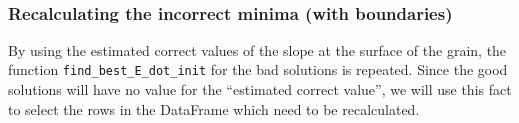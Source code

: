 \documentclass[11pt]{article}
\begin{document}
    \begin{center}
    \end{center}
    { \hspace*{\fill} \\}
    
    \hypertarget{recalculating-the-incorrect-minima-with-boundaries}{%
\subsubsection{Recalculating the incorrect minima (with
boundaries)}\label{recalculating-the-incorrect-minima-with-boundaries}}

By using the estimated correct values of the slope at the surface of the
grain, the function \texttt{find\_best\_E\_dot\_init} for the bad
solutions is repeated. Since the good solutions will have no value for
the ``estimated correct value'', we will use this fact to select the
rows in the DataFrame which need to be recalculated.
\end{document}
